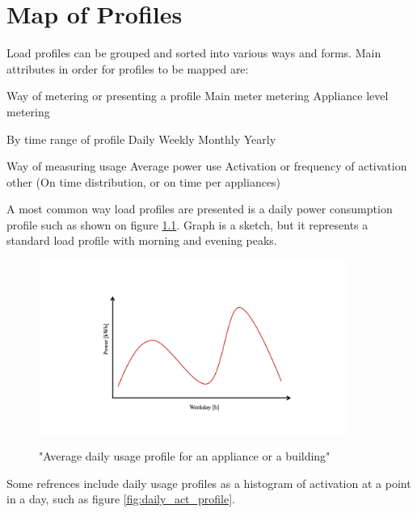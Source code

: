 \chapter{Map of Profiles} %

\label{Chapter6} %

Load profiles can be grouped and sorted into various ways and forms.
Main attributes in order for profiles to be mapped are: 

\begin{outline}

\1 Way of metering or presenting a profile
\2 Main meter metering
\2 Appliance level metering

\1 By time range of profile 
\2 Daily
\2 Weekly
\2 Monthly
\2 Yearly

\1 Way of measuring usage
\2 Average power use 
\2 Activation or frequency of activation
\2 other (On time distribution, or on time per appliances)
\end{outline}

A most common way load profiles are presented is a daily power consumption profile such as shown on figure \ref{fig:daily_power_profile}. 
Graph is a sketch, but it represents a standard load profile with morning and evening peaks.

\begin{figure}[H]
	\centering
	\caption{"Average daily usage profile for an appliance or a building"}
	\includegraphics[width=0.9\textwidth]{Figures/profile_sketches/Slide1.png}
	\label{fig:daily_power_profile}
\end{figure}

Some refrences include daily usage profiles as a histogram of activation at a point in a day, such as figure \ref{fig:daily_act_profile}.

